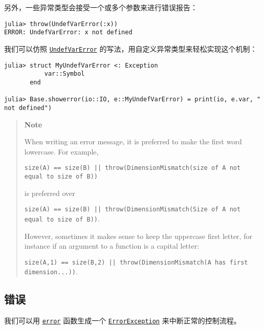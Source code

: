 另外，一些异常类型会接受一个或多个参数来进行错误报告：




\begin{verbatim}
julia> throw(UndefVarError(:x))
ERROR: UndefVarError: x not defined
\end{verbatim}



我们可以仿照 \hyperlink{4452889246677411554}{\texttt{UndefVarError}} 的写法，用自定义异常类型来轻松实现这个机制：




\begin{verbatim}
julia> struct MyUndefVarError <: Exception
           var::Symbol
       end

julia> Base.showerror(io::IO, e::MyUndefVarError) = print(io, e.var, " not defined")
\end{verbatim}



\begin{quote}
\textbf{Note}

When writing an error message, it is preferred to make the first word lowercase. For example,

\texttt{size(A) == size(B) || throw(DimensionMismatch({\textquotedbl}size of A not equal to size of B{\textquotedbl}))}

is preferred over

\texttt{size(A) == size(B) || throw(DimensionMismatch({\textquotedbl}Size of A not equal to size of B{\textquotedbl}))}.

However, sometimes it makes sense to keep the uppercase first letter, for instance if an argument to a function is a capital letter:

\texttt{size(A,1) == size(B,2) || throw(DimensionMismatch({\textquotedbl}A has first dimension...{\textquotedbl}))}.

\end{quote}


\hypertarget{18278096073868016389}{}


\subsection{错误}



我们可以用 \hyperlink{17992125292605951734}{\texttt{error}} 函数生成一个 \hyperlink{12102596058483452470}{\texttt{ErrorException}} 来中断正常的控制流程。



